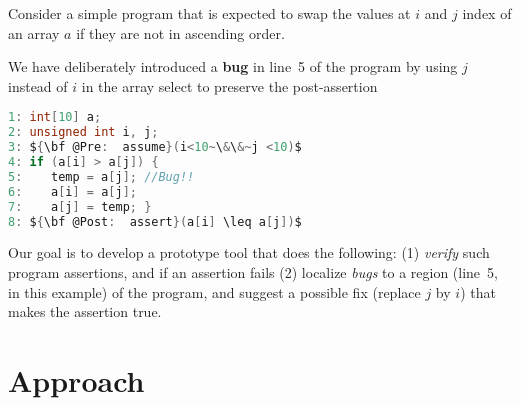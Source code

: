 \documentclass[letterpaper]{article} %
\begin{document}
Consider a simple program that is expected to swap the values at $i$ and $j$ index of an array $a$ if they are not in ascending order.

We have deliberately introduced a {\bf bug} in line~5 of the program by using $j$ instead of $i$ in the array select to preserve the post-assertion\\ 

\begin{lstlisting}[language=C, mathescape=true]
1: int[10] a;
2: unsigned int i, j;
3: ${\bf @Pre:  assume}(i<10~\&\&~j <10)$
4: if (a[i] > a[j]) {
5:    temp = a[j]; //Bug!!
6:    a[i] = a[j];
7:    a[j] = temp; }
8: ${\bf @Post:  assert}(a[i] \leq a[j])$
\end{lstlisting}
$ $\\
Our goal is to develop a prototype tool that does the following:
(1) \emph{verify} such program assertions, and if an assertion fails (2) localize \emph{bugs} to a region (line~5, in this example) of the program, and suggest a possible fix (replace $j$ by $i$) that makes the assertion true.
\section {Approach}
\end{document}
